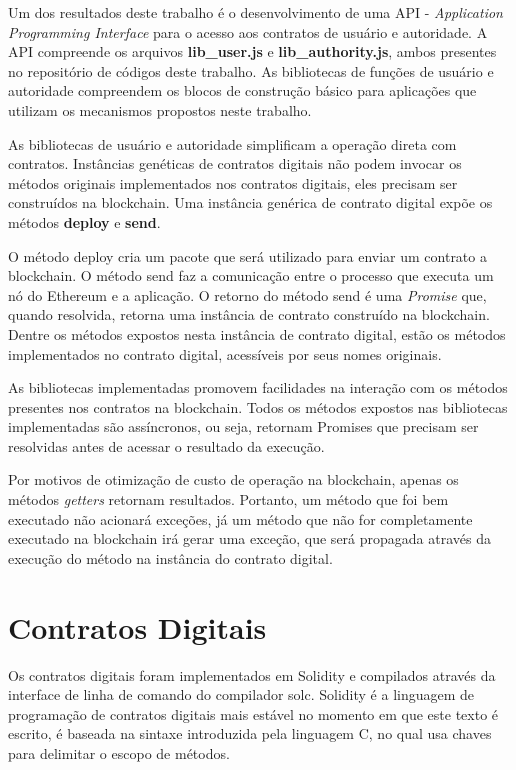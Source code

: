 \documentclass[tcc,capa]{texufpel}
\begin{document}
    Um dos resultados deste trabalho é o desenvolvimento de uma API - \textit{Application Programming Interface} para o acesso aos contratos de usuário e autoridade. A API compreende os arquivos \textbf{lib\_user.js} e \textbf{lib\_authority.js}, ambos presentes no repositório de códigos deste trabalho. As bibliotecas de funções de usuário e autoridade compreendem os blocos de construção básico para aplicações que utilizam os mecanismos propostos neste trabalho.
    
    As bibliotecas de usuário e autoridade simplificam a operação direta com contratos. Instâncias genéticas de contratos digitais não podem invocar os métodos originais implementados nos contratos digitais, eles precisam ser construídos na blockchain. Uma instância genérica de contrato digital expõe os métodos \textbf{deploy} e \textbf{send}.
    
    O método deploy cria um pacote que será utilizado para enviar um contrato a blockchain. O método send faz a comunicação entre o processo que executa um nó do Ethereum e a aplicação. O retorno do método send é uma \textit{Promise} que, quando resolvida, retorna uma instância de contrato construído na blockchain. Dentre os métodos expostos nesta instância de contrato digital, estão os métodos implementados no contrato digital, acessíveis por seus nomes originais.
    
    As bibliotecas implementadas promovem facilidades na interação com os métodos presentes nos contratos na blockchain. Todos os métodos expostos nas bibliotecas implementadas são assíncronos, ou seja, retornam Promises que precisam ser resolvidas antes de acessar o resultado da execução.
    
    Por motivos de otimização de custo de operação na blockchain, apenas os métodos \textit{getters} retornam resultados. Portanto, um método que foi bem executado não acionará exceções, já um método que não for completamente executado na blockchain irá gerar uma exceção, que será propagada através da execução do método na instância do contrato digital.
    
    \section{Contratos Digitais}
    
    Os contratos digitais foram implementados em Solidity e compilados através da interface de linha de comando do compilador solc. Solidity é a linguagem de programação de contratos digitais mais estável no momento em que este texto é escrito, é baseada na sintaxe introduzida pela linguagem C, no qual usa chaves para delimitar o escopo de métodos.
    
\end{document}
